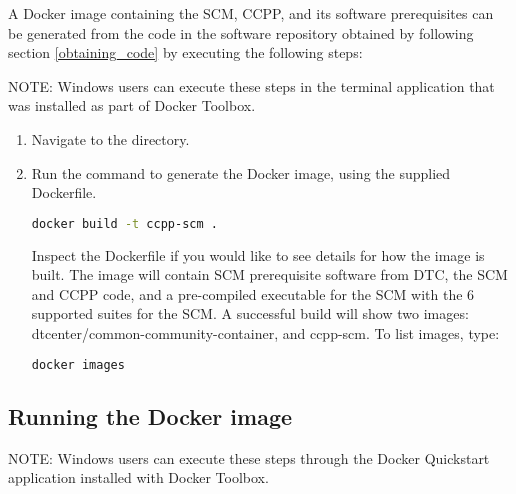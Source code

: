 A Docker image containing the SCM, CCPP, and its software prerequisites can be generated from the code in the software repository obtained by following section \ref{obtaining_code} by executing the following steps:

NOTE: Windows users can execute these steps in the terminal application that was installed as part of Docker Toolbox.

\begin{enumerate}
\item Navigate to the  directory.
\item Run the  command to generate the Docker image, using the supplied Dockerfile.
\begin{lstlisting}[language=bash]
docker build -t ccpp-scm .
\end{lstlisting}
Inspect the Dockerfile if you would like to see details for how the image is built. The image will contain SCM prerequisite software from DTC, the SCM and CCPP code, and a pre-compiled executable for the SCM with the 6 supported suites for the SCM. A successful build will show two images: dtcenter/common-community-container, and ccpp-scm. To list images, type:
\begin{lstlisting}[language=bash]
docker images
\end{lstlisting}
\end{enumerate}

\subsection{Running the Docker image}

NOTE: Windows users can execute these steps through the Docker Quickstart application installed with Docker Toolbox.

